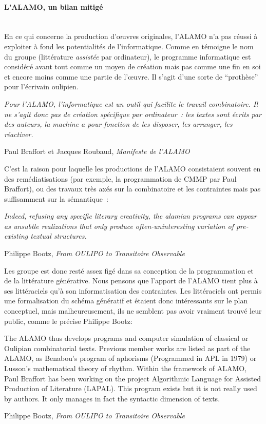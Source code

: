 \documentclass{article}
\newcommand{\subsubsubsection}[1]{\paragraph{#1}\mbox{}\\}
\newenvironment{citationbox}
{\begin{center}
		\begin{minipage}{.8\textwidth}
		}
		{
		\end{minipage}	
\end{center}
}
\begin{document}
					
				\subsubsubsection{L'ALAMO, un bilan mitigé}
					En ce qui concerne la production d'œuvres originales, l'ALAMO n'a pas réussi à exploiter à fond les potentialités de l'informatique. Comme en témoigne le nom du groupe (littérature \textit{assistée} par ordinateur), le programme informatique est considéré avant tout comme un moyen de création mais pas comme une fin en soi et encore moins comme une partie de l'œuvre. Il s'agit d'une sorte de ``prothèse'' pour l'écrivain oulipien.
					\begin{citationbox}
						\textit{Pour l’ALAMO, l’informatique est un outil qui facilite le travail combinatoire. Il ne s’agit donc pas de création spécifique par ordinateur~: les textes sont écrits par des auteurs, la machine a pour fonction de les disposer, les arranger, les réactiver.}
						\begin{flushright}
							Paul Braffort et Jacques Roubaud, \textit{Manifeste de l'ALAMO}
						\end{flushright}
					\end{citationbox}
					C'est la raison pour laquelle les productions de l'ALAMO consistaient souvent en des  remédiatisations (par exemple, la programmation de CMMP par Paul Braffort), ou des travaux très axés sur la combinatoire et les contraintes mais pas suffisamment sur la sémantique~:
					\begin{citationbox}
						\textit{Indeed, refusing any specific literary creativity, the alamian programs can appear as unsubtle realizations that only produce often-uninteresting variation of pre-existing textual structures.}
						\begin{flushleft}
							Philippe Bootz, \textit{From OULIPO to Transitoire Observable} \cite{bootz2012}
						\end{flushleft}
					\end{citationbox}
					Les groupe est donc resté assez figé dans sa conception de la programmation et de la littérature générative. Nous pensons que l'apport de l'ALAMO tient plus à ses littéraciels qu'à son informatisation des contraintes. Les littéraciels ont permis une formalisation du schéma génératif et étaient donc intéressants sur le plan conceptuel, mais malheureusement, ils ne semblent pas avoir vraiment trouvé leur public, comme le précise Philippe Bootz:
					\begin{citationbox}
						The ALAMO thus develops programs and computer simulation of classical or Oulipian combinatorial texts. Previous member works are listed as part of the ALAMO, as Benabou's program of aphorisms (Programmed in APL in 1979) or Lusson's mathematical theory of rhythm. Within the framework of ALAMO, Paul Braffort has been working on the project Algorithmic Language for Assisted Production of Literature (LAPAL). This program exists but it is not really used by authors. It only manages in fact the syntactic dimension of texts.
						\begin{flushright}
							Philippe Bootz, \textit{From OULIPO to Transitoire Observable} \cite{bootz2012}
						\end{flushright}
					\end{citationbox}
				
\end{document}
